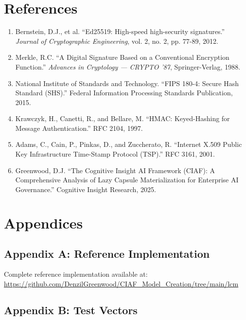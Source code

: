 \documentclass[12pt,a4paper]{article}
\begin{document}
\newpage

\section*{References}

\begin{enumerate}
\item Bernstein, D.J., et al. ``Ed25519: High-speed high-security signatures.'' \textit{Journal of Cryptographic Engineering}, vol. 2, no. 2, pp. 77-89, 2012.

\item Merkle, R.C. ``A Digital Signature Based on a Conventional Encryption Function.'' \textit{Advances in Cryptology — CRYPTO '87}, Springer-Verlag, 1988.

\item National Institute of Standards and Technology. ``FIPS 180-4: Secure Hash Standard (SHS).'' Federal Information Processing Standards Publication, 2015.

\item Krawczyk, H., Canetti, R., and Bellare, M. ``HMAC: Keyed-Hashing for Message Authentication.'' RFC 2104, 1997.

\item Adams, C., Cain, P., Pinkas, D., and Zuccherato, R. ``Internet X.509 Public Key Infrastructure Time-Stamp Protocol (TSP).'' RFC 3161, 2001.

\item Greenwood, D.J. ``The Cognitive Insight AI Framework (CIAF): A Comprehensive Analysis of Lazy Capsule Materialization for Enterprise AI Governance.'' Cognitive Insight Research, 2025.
\end{enumerate}

\newpage

\section*{Appendices}

\subsection*{Appendix A: Reference Implementation}

Complete reference implementation available at: \\
\url{https://github.com/DenzilGreenwood/CIAF_Model_Creation/tree/main/lcm}

\subsection*{Appendix B: Test Vectors}
\end{document}

